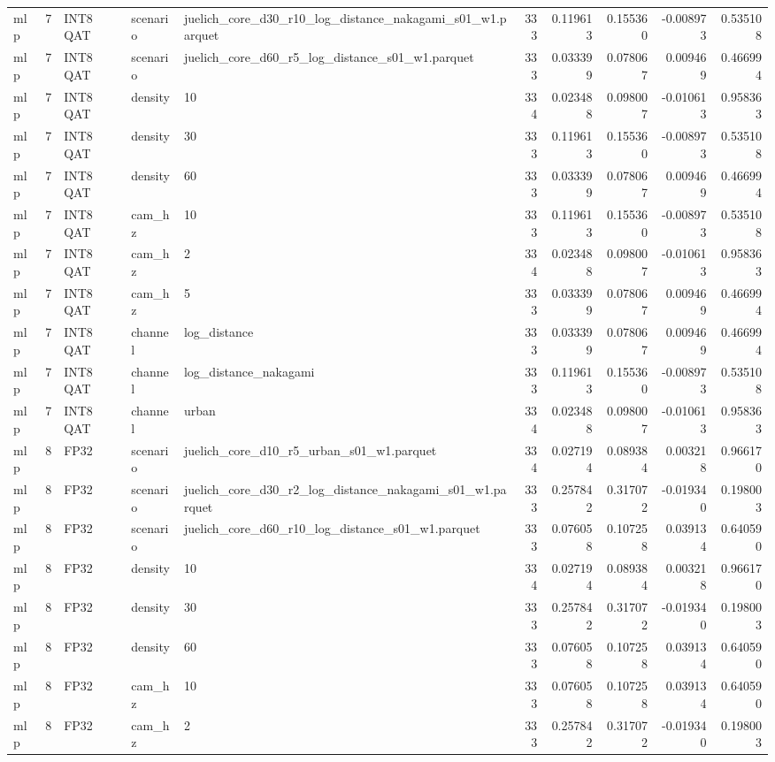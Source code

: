 \begin{tabular}{lrlllrrrrr}
mlp & 7 & INT8 QAT & scenario & juelich\_core\_d30\_r10\_log\_distance\_nakagami\_s01\_w1.parquet & 333 & 0.119613 & 0.155360 & -0.008973 & 0.535108 \\
mlp & 7 & INT8 QAT & scenario & juelich\_core\_d60\_r5\_log\_distance\_s01\_w1.parquet & 333 & 0.033399 & 0.078067 & 0.009469 & 0.466994 \\
mlp & 7 & INT8 QAT & density & 10 & 334 & 0.023488 & 0.098007 & -0.010613 & 0.958363 \\
mlp & 7 & INT8 QAT & density & 30 & 333 & 0.119613 & 0.155360 & -0.008973 & 0.535108 \\
mlp & 7 & INT8 QAT & density & 60 & 333 & 0.033399 & 0.078067 & 0.009469 & 0.466994 \\
mlp & 7 & INT8 QAT & cam\_hz & 10 & 333 & 0.119613 & 0.155360 & -0.008973 & 0.535108 \\
mlp & 7 & INT8 QAT & cam\_hz & 2 & 334 & 0.023488 & 0.098007 & -0.010613 & 0.958363 \\
mlp & 7 & INT8 QAT & cam\_hz & 5 & 333 & 0.033399 & 0.078067 & 0.009469 & 0.466994 \\
mlp & 7 & INT8 QAT & channel & log\_distance & 333 & 0.033399 & 0.078067 & 0.009469 & 0.466994 \\
mlp & 7 & INT8 QAT & channel & log\_distance\_nakagami & 333 & 0.119613 & 0.155360 & -0.008973 & 0.535108 \\
mlp & 7 & INT8 QAT & channel & urban & 334 & 0.023488 & 0.098007 & -0.010613 & 0.958363 \\
mlp & 8 & FP32 & scenario & juelich\_core\_d10\_r5\_urban\_s01\_w1.parquet & 334 & 0.027194 & 0.089384 & 0.003218 & 0.966170 \\
mlp & 8 & FP32 & scenario & juelich\_core\_d30\_r2\_log\_distance\_nakagami\_s01\_w1.parquet & 333 & 0.257842 & 0.317072 & -0.019340 & 0.198003 \\
mlp & 8 & FP32 & scenario & juelich\_core\_d60\_r10\_log\_distance\_s01\_w1.parquet & 333 & 0.076058 & 0.107258 & 0.039134 & 0.640590 \\
mlp & 8 & FP32 & density & 10 & 334 & 0.027194 & 0.089384 & 0.003218 & 0.966170 \\
mlp & 8 & FP32 & density & 30 & 333 & 0.257842 & 0.317072 & -0.019340 & 0.198003 \\
mlp & 8 & FP32 & density & 60 & 333 & 0.076058 & 0.107258 & 0.039134 & 0.640590 \\
mlp & 8 & FP32 & cam\_hz & 10 & 333 & 0.076058 & 0.107258 & 0.039134 & 0.640590 \\
mlp & 8 & FP32 & cam\_hz & 2 & 333 & 0.257842 & 0.317072 & -0.019340 & 0.198003 \\

\end{tabular}
